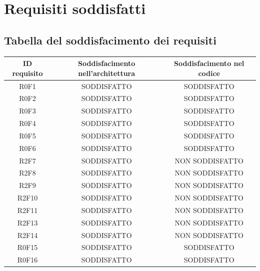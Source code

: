 \section{Requisiti soddisfatti}
\subsection{Tabella del soddisfacimento dei requisiti}
\begin{table}[hp]
\centering
\begin{tabular}{|c|c|c|}
\hline
ID requisito & Soddisfacimento nell'architettura & Soddisfacimento nel codice \\ \hline
R0F1         & SODDISFATTO                       & SODDISFATTO                \\ \hline
R0F2         & SODDISFATTO                       & SODDISFATTO                \\ \hline
R0F3         & SODDISFATTO                       & SODDISFATTO                \\ \hline
R0F4        & SODDISFATTO                       & SODDISFATTO                \\ \hline
R0F5        & SODDISFATTO                       & SODDISFATTO                \\ \hline
R0F6        & SODDISFATTO                       & SODDISFATTO                \\ \hline
R2F7        & SODDISFATTO                       & NON SODDISFATTO                \\ \hline
R2F8        & SODDISFATTO                       & NON SODDISFATTO                \\ \hline
R2F9        & SODDISFATTO                       & NON SODDISFATTO                \\ \hline
R2F10        & SODDISFATTO                       & NON SODDISFATTO                \\ \hline
R2F11        & SODDISFATTO                       & NON SODDISFATTO                \\ \hline
R2F13        & SODDISFATTO                       & NON SODDISFATTO                \\ \hline
R2F14        & SODDISFATTO                       & NON SODDISFATTO                \\ \hline
R0F15        & SODDISFATTO                       & SODDISFATTO                \\ \hline
R0F16        & SODDISFATTO                       & SODDISFATTO                \\ \hline

\end{tabular}
\end{table}
